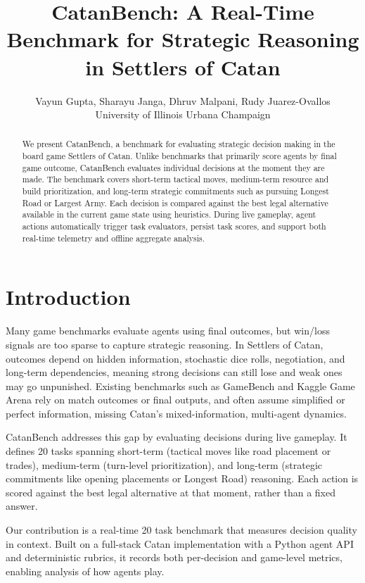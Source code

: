 \documentclass{article}
\title{CatanBench: A Real-Time Benchmark for Strategic Reasoning in Settlers of Catan}
\author{Vayun Gupta, Sharayu Janga, Dhruv Malpani, Rudy Juarez-Ovallos \\
University of Illinois Urbana Champaign \\
}
\begin{document}
\maketitle

\begin{abstract}
    We present CatanBench, a benchmark for evaluating strategic decision making in the board game Settlers of Catan. Unlike benchmarks that primarily score agents by final game outcome, CatanBench evaluates individual decisions at the moment they are made. The benchmark covers short-term tactical moves, medium-term resource and build prioritization, and long-term strategic commitments such as pursuing Longest Road or Largest Army. Each decision is compared against the best legal alternative available in the current game state using heuristics. During live gameplay, agent actions automatically trigger task evaluators, persist task scores, and support both real-time telemetry and offline aggregate analysis.
\end{abstract}

\section{Introduction}
\label{sec:introduction}

Many game benchmarks evaluate agents using final outcomes, but win/loss signals are too sparse to capture strategic reasoning. In Settlers of Catan, outcomes depend on hidden information, stochastic dice rolls, negotiation, and long-term dependencies, meaning strong decisions can still lose and weak ones may go unpunished. Existing benchmarks such as GameBench and Kaggle Game Arena rely on match outcomes or final outputs, and often assume simplified or perfect information, missing Catan’s mixed-information, multi-agent dynamics.

CatanBench addresses this gap by evaluating decisions during live gameplay. It defines 20 tasks spanning short-term (tactical moves like road placement or trades), medium-term (turn-level prioritization), and long-term (strategic commitments like opening placements or Longest Road) reasoning. Each action is scored against the best legal alternative at that moment, rather than a fixed answer.

Our contribution is a real-time 20 task benchmark that measures decision quality in context. Built on a full-stack Catan implementation with a Python agent API and deterministic rubrics, it records both per-decision and game-level metrics, enabling analysis of how agents play.
\end{document}
